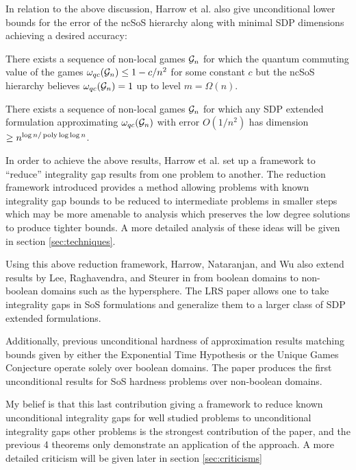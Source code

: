 \documentclass[runningheads,a4paper,english]{llncs}[2022/01/12]
\begin{document}
In relation to the above discussion, Harrow et al. also give unconditional lower bounds for the error of the ncSoS hierarchy along with minimal SDP dimensions achieving a desired accuracy:

\begin{theorem}
  There exists a sequence of non-local games $\mathcal{G}_n$ for which the quantum commuting value of the games $\omega_{qc}(\mathcal{G}_n) \le 1 - c/n^2$ for some constant $c$ but the ncSoS hierarchy believes $\omega_{qc}(\mathcal{G}_n) = 1$ up to level $m = \Omega(n)$.
\end{theorem}

\begin{theorem}
  There exists a sequence of non-local games $\mathcal{G}_n$ for which any SDP extended formulation approximating $\omega_{qc}(\mathcal{G}_n)$ with error $O(1/n^2)$ has dimension $\ge n^{\log n/\operatorname{poly} \log \log n}$.
\end{theorem}

In order to achieve the above results, Harrow et al. set up a framework to ``reduce'' integrality gap results from one problem to another.
The reduction framework introduced provides a method allowing problems with known integrality gap bounds to be reduced to intermediate problems in smaller steps which may be more amenable to analysis which preserves the low degree solutions to produce tighter bounds.
A more detailed analysis of these ideas will be given in section \ref{sec:techniques}.

Using this above reduction framework, Harrow, Nataranjan, and Wu also extend results by Lee, Raghavendra, and Steurer in \cite{lee2014lowerboundssizesemidefinite} from boolean domains to non-boolean domains such as the hypersphere. The LRS paper allows one to take integrality gaps in SoS formulations and generalize them to a larger class of SDP extended formulations.

Additionally, previous unconditional hardness of approximation results \cite{tulsiani2009csp,odonnell2014hardnessrobustgraphisomorphism} matching bounds given by either the Exponential Time Hypothesis or the Unique Games Conjecture operate solely over boolean domains.
The paper produces the first unconditional results for SoS hardness problems over non-boolean domains.

My belief is that this last contribution giving a framework to reduce known unconditional integrality gaps for well studied problems to unconditional integrality gaps other problems is the strongest contribution of the paper, and the previous 4 theorems only demonstrate an application of the approach.
A more detailed criticism will be given later in section \ref{sec:criticisms}
\end{document}
